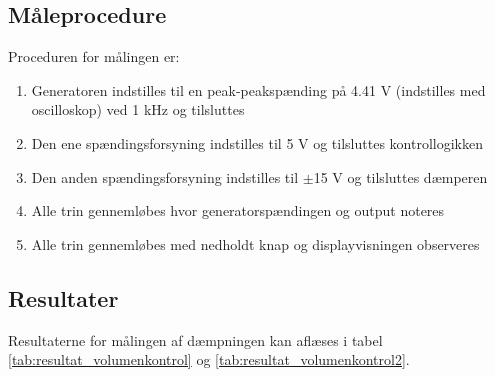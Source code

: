 \subsection*{Måleprocedure}
Proceduren for målingen er:

\begin{enumerate}
\item Generatoren indstilles til en peak-peakspænding på 4.41 V (indstilles med oscilloskop) ved 1 kHz og tilsluttes
\item Den ene spændingsforsyning indstilles til 5 V og tilsluttes kontrollogikken
\item Den anden spændingsforsyning indstilles til $\pm$15 V og tilsluttes dæmperen
\item Alle trin gennemløbes hvor generatorspændingen og output noteres
\item Alle trin gennemløbes med nedholdt knap og displayvisningen observeres
\end{enumerate}

\subsection*{Resultater}

Resultaterne for målingen af dæmpningen kan aflæses i tabel \ref{tab:resultat_volumenkontrol} og \ref{tab:resultat_volumenkontrol2}.

